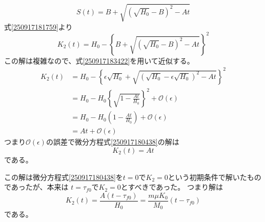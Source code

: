 \documentclass[dvipdfmx]{article}
\begin{document}
\begin{equation} \label{250917182410} 
   S(t) = B + \sqrt{(\sqrt{H_0}-B)^2-At}
\end{equation}
式\eqref{250917181759}より
\begin{equation} \label{250917183653} 
   K_2(t) = H_0 - \left\{
   				B + \sqrt{(\sqrt{H_0}-B)^2-At}
   				\right\}^2
\end{equation}
%
この解は複雑なので、式\eqref{250917183422}を用いて近似する。
\begin{align}
   K_2(t) &= H_0 - \left\{
   				\epsilon \sqrt{H_0} + \sqrt{(\sqrt{H_0}-\epsilon \sqrt{H_0})^2-At}
   				\right\}^2   \label{250918054717a} \\
   &=    H_0 - H_0\left\{
   				 \sqrt{1-\frac{At}{H_0}}
   				\right\}^2  + \mathcal{O}(\epsilon)  \label{250918054717d}\\
   &=    H_0 - H_0\left(
   				 1-\frac{At}{H_0}
   				\right) + \mathcal{O}(\epsilon)  \label{250918054717e}\\
   &=    At + \mathcal{O}(\epsilon)  \label{250918054717f}
\end{align}
つまり$\mathcal{O}(\epsilon) $の誤差で微分方程式\eqref{250917180438}の解は
\begin{equation} \label{250918075020} 
   K_2(t) = At
\end{equation}
である。



この解は微分方程式\eqref{250917180438}を$t=0$で$K_2=0$という初期条件で解いたものであったが、本来は
$t=\tau_{f0}$で$K_2=0$とすべきであった。
つまり解は
\begin{equation} \label{250917184208} 
   K_2(t) =  \frac{A(t-\tau_{f0})}{H_0} = \frac{m \mu K_0}{M_0}(t-\tau_{f0})
\end{equation}
である。
\end{document}
